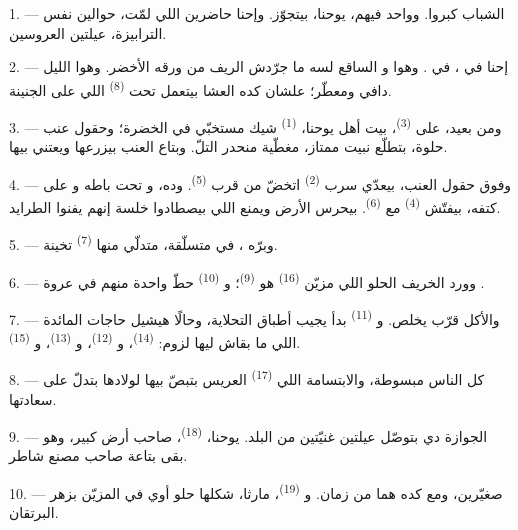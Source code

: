 1. --- الشباب كبروا. وواحد فيهم، يوحنا، بيتجوّز. وإحنا حاضرين
 اللي لمّت، حوالين نفس الترابيزة، عيلتين العروسين.

2. --- إحنا في ، في . وهوا 
و الساقع لسه ما جرّدش الريف من ورقه الأخضر. وهوا الليل دافي
ومعطّر؛ علشان كده العشا بيتعمل تحت  \textsuperscript{(8)} اللي على
الجنينة.

3. --- ومن بعيد، على  \textsuperscript{(3)}، بيت أهل يوحنا،
 \textsuperscript{(1)} شيك مستخبّي في الخضرة؛ وحقول عنب حلوة، بتطلّع نبيت
ممتاز، مغطّية منحدر التلّ. وبتاع العنب بيزرعها ويعتني بيها.

4. --- وفوق حقول العنب، بيعدّي سرب  \textsuperscript{(2)} اتخضّ من قرب
 \textsuperscript{(5)}. وده، و تحت باطه و على كتفه، بيفتّش  \textsuperscript{(4)} مع 
\textsuperscript{(6)}. بيحرس الأرض ويمنع اللي بيصطادوا خلسة إنهم يفنوا الطرايد.

5. --- وبرّه ، في  متسلّقة، متدلّي منها
 \textsuperscript{(7)} تخينة.

6. --- وورد الخريف الحلو اللي مزيّن  \textsuperscript{(16)} هو
 \textsuperscript{(9)}؛ و \textsuperscript{(10)} حطّ
واحدة
منهم في عروة .

7. --- والأكل قرّب يخلص. و \textsuperscript{(11)} بدأ يجيب أطباق
التحلاية، وحالًا هيشيل حاجات المائدة اللي ما بقاش ليها لزوم:
 \textsuperscript{(14)}، و \textsuperscript{(12)}،
و \textsuperscript{(13)}، و \textsuperscript{(15)}.

\VUsaut{3.0mm}

8. --- كل الناس مبسوطة، والابتسامة اللي  \textsuperscript{(17)} العريس بتبصّ
بيها لولادها بتدلّ على سعادتها.

9. --- الجوازة دي بتوصّل عيلتين غنيّتين من البلد. يوحنا، 
\textsuperscript{(18)}،  صاحب أرض كبير، وهو بقى  بتاعة
صاحب مصنع شاطر.

10. ---  صغيّرين، ومع كده هما  من زمان.
و \textsuperscript{(19)}، مارثا، شكلها حلو أوي في 
المزيّن بزهر البرتقان.

